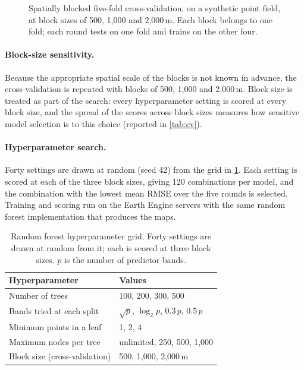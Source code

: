\begin{figure}[htbp]
  \centering
  \caption{Spatially blocked five-fold cross-validation, on a synthetic point
  field, at block sizes of 500, 1{,}000 and 2{,}000\,m. Each block belongs to
  one fold; each round tests on one fold and trains on the other four.}
  \label{fig:fivefold}
\end{figure}

\paragraph{Block-size sensitivity.} Because the appropriate spatial scale of
the blocks is not known in advance, the cross-validation is repeated with
blocks of 500, 1{,}000 and 2{,}000\,m. Block size is treated as part of the
search: every hyperparameter setting is scored at every block size, and the
spread of the scores across block sizes measures how sensitive model
selection is to this choice (reported in \cref{tab:cv}).

\paragraph{Hyperparameter search.} Forty settings are drawn at random
(seed 42) from the grid in \cref{tab:grid}. Each setting is scored at each of
the three block sizes, giving 120 combinations per model, and the
combination with the lowest mean RMSE over the five rounds is selected.
Training and scoring run on the Earth Engine servers with the same random
forest implementation that produces the maps.

\begin{table}[htbp]
  \centering
  \small
  \caption{Random forest hyperparameter grid. Forty settings are drawn at
  random from it; each is scored at three block sizes. $p$ is the number of
  predictor bands.}
  \label{tab:grid}
  \begin{tabular}{ll}
    \toprule
    Hyperparameter & Values \\
    \midrule
    Number of trees & 100, 200, 300, 500 \\
    Bands tried at each split & $\sqrt{p}$, $\log_2 p$, $0.3\,p$, $0.5\,p$ \\
    Minimum points in a leaf & 1, 2, 4 \\
    Maximum nodes per tree & unlimited, 250, 500, 1{,}000 \\
    Block size (cross-validation) & 500, 1{,}000, 2{,}000\,m \\
    \bottomrule
  \end{tabular}
\end{table}

